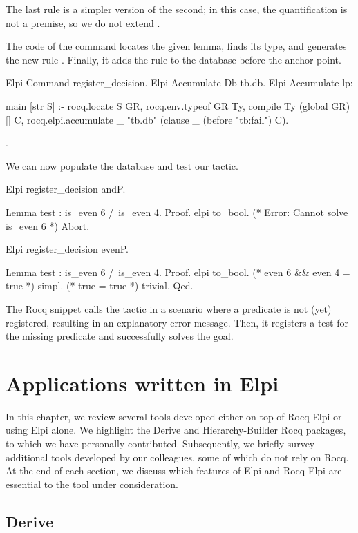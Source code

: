 \documentclass[a4paper, 11pt]{book}
\begin{document}
The last rule is a simpler version of the second; in this case, the
quantification is not a premise, so we do not extend .


The code of the  command locates the given lemma,
finds its type, and generates the new rule . Finally, it adds the rule
to the database before the  anchor point.

\begin{rocqcode}
Elpi Command register_decision.
Elpi Accumulate Db tb.db.
Elpi Accumulate lp:{{
    
main [str S] :-
  rocq.locate S GR,
  rocq.env.typeof GR Ty,
  compile Ty (global GR) [] C,
  rocq.elpi.accumulate _ "tb.db" (clause _ (before "tb:fail") C).

}}.
\end{rocqcode}


We can now populate the database and test our tactic.

\begin{rocqcode}
Elpi register_decision andP.

Lemma test : is_even 6 /\ is_even 4.
Proof.
elpi to_bool. (* Error: Cannot solve is_even 6 *)
Abort.

Elpi register_decision evenP.

Lemma test : is_even 6 /\ is_even 4.
Proof.
elpi to_bool. (* even 6 && even 4 = true *)
simpl.        (* true = true *)
trivial.
Qed.
\end{rocqcode}
  

The Rocq snippet calls the  tactic in a scenario where a
predicate is not (yet) registered, resulting in an explanatory error message.
Then, it registers a test for the missing predicate and successfully solves
the goal.


\chapter{Applications written in Elpi}

In this chapter, we review several tools developed either on top of Rocq-Elpi
or using Elpi alone.
We highlight the Derive and Hierarchy-Builder Rocq packages, to which we have
personally contributed.
Subsequently, we briefly survey additional tools developed by our colleagues,
some of which do not rely on Rocq.
At the end of each section, we discuss which features of Elpi and Rocq-Elpi are
essential to the tool under consideration.

\section{Derive}\label{sec:derive}
\end{document}
